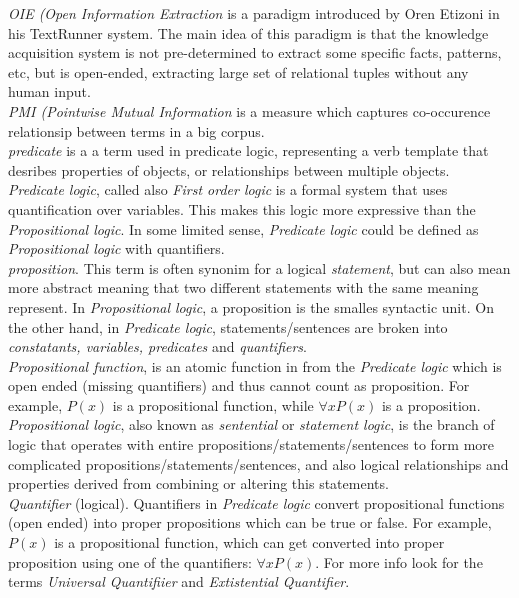 \emph{OIE (Open Information Extraction} is a paradigm introduced by Oren Etizoni
in his TextRunner system. The main idea of this paradigm is that the knowledge 
acquisition system is not pre-determined to extract some specific facts, 
patterns, etc, but is open-ended, extracting large set of relational tuples 
without any human input.\\

\emph{PMI (Pointwise Mutual Information} is a measure which captures 
co-occurence relationsip between terms in a big corpus.\\

\emph{predicate} is a a term used in predicate logic, representing a verb
template that desribes properties of objects, or relationships between multiple
objects.\\

\emph{Predicate logic}, called also \emph{First order logic} is a formal system
that uses quantification over variables. This makes this logic more expressive
than the \emph{Propositional logic}. In some limited sense, 
\emph{Predicate logic} could be defined as \emph{Propositional logic} with 
quantifiers.\\

\emph{proposition}. This term is often synonim for a logical \emph{statement},
but can also mean more abstract meaning that two different statements with the
same meaning represent. In \emph{Propositional logic}, a proposition is the
smalles syntactic unit. On the other hand, in \emph{Predicate logic}, 
statements/sentences are broken into \emph{constatants, variables, predicates}
and \emph{quantifiers}.\\

\emph{Propositional function}, is an atomic function in from the 
\emph{Predicate logic} which is open ended (missing quantifiers) and thus
cannot count as proposition. For example, $P(x)$ is a propositional function,
while $\forall x P(x)$ is a proposition.\\

\emph{Propositional logic}, also known as \emph{sentential} or 
\emph{statement logic}, is the branch of logic that operates with entire
propositions/statements/sentences to form more complicated 
propositions/statements/sentences, and also logical relationships and properties
derived from combining  or altering this statements.\\

\emph{Quantifier} (logical). Quantifiers in \emph{Predicate logic} convert
propositional functions (open ended) into proper propositions which can be true
or false. For example, $P(x)$ is a propositional function, which can get
converted into proper proposition using one of the quantifiers: 
$\forall x P(x)$. For more info look for the terms \emph{Universal Quantifiier}
and \emph{Extistential Quantifier}.\\


